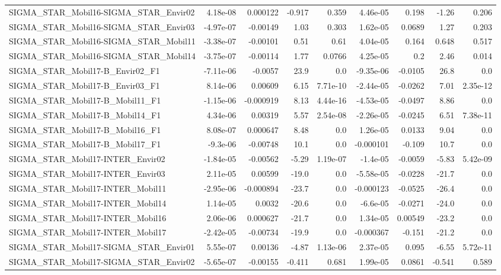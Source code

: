 \begin{tabular}{lrrrrrrrr}
SIGMA_STAR_Mobil16-SIGMA_STAR_Envir02 & 4.18e-08 & 0.000122 & -0.917 & 0.359 & 4.46e-05 & 0.198 & -1.26 & 0.206 \\
SIGMA_STAR_Mobil16-SIGMA_STAR_Envir03 & -4.97e-07 & -0.00149 & 1.03 & 0.303 & 1.62e-05 & 0.0689 & 1.27 & 0.203 \\
SIGMA_STAR_Mobil16-SIGMA_STAR_Mobil11 & -3.38e-07 & -0.00101 & 0.51 & 0.61 & 4.04e-05 & 0.164 & 0.648 & 0.517 \\
SIGMA_STAR_Mobil16-SIGMA_STAR_Mobil14 & -3.75e-07 & -0.00114 & 1.77 & 0.0766 & 4.25e-05 & 0.2 & 2.46 & 0.014 \\
SIGMA_STAR_Mobil17-B_Envir02_F1 & -7.11e-06 & -0.0057 & 23.9 & 0.0 & -9.35e-06 & -0.0105 & 26.8 & 0.0 \\
SIGMA_STAR_Mobil17-B_Envir03_F1 & 8.14e-06 & 0.00609 & 6.15 & 7.71e-10 & -2.44e-05 & -0.0262 & 7.01 & 2.35e-12 \\
SIGMA_STAR_Mobil17-B_Mobil11_F1 & -1.15e-06 & -0.000919 & 8.13 & 4.44e-16 & -4.53e-05 & -0.0497 & 8.86 & 0.0 \\
SIGMA_STAR_Mobil17-B_Mobil14_F1 & 4.34e-06 & 0.00319 & 5.57 & 2.54e-08 & -2.26e-05 & -0.0245 & 6.51 & 7.38e-11 \\
SIGMA_STAR_Mobil17-B_Mobil16_F1 & 8.08e-07 & 0.000647 & 8.48 & 0.0 & 1.26e-05 & 0.0133 & 9.04 & 0.0 \\
SIGMA_STAR_Mobil17-B_Mobil17_F1 & -9.3e-06 & -0.00748 & 10.1 & 0.0 & -0.000101 & -0.109 & 10.7 & 0.0 \\
SIGMA_STAR_Mobil17-INTER_Envir02 & -1.84e-05 & -0.00562 & -5.29 & 1.19e-07 & -1.4e-05 & -0.0059 & -5.83 & 5.42e-09 \\
SIGMA_STAR_Mobil17-INTER_Envir03 & 2.11e-05 & 0.00599 & -19.0 & 0.0 & -5.58e-05 & -0.0228 & -21.7 & 0.0 \\
SIGMA_STAR_Mobil17-INTER_Mobil11 & -2.95e-06 & -0.000894 & -23.7 & 0.0 & -0.000123 & -0.0525 & -26.4 & 0.0 \\
SIGMA_STAR_Mobil17-INTER_Mobil14 & 1.14e-05 & 0.0032 & -20.6 & 0.0 & -6.6e-05 & -0.0271 & -24.0 & 0.0 \\
SIGMA_STAR_Mobil17-INTER_Mobil16 & 2.06e-06 & 0.000627 & -21.7 & 0.0 & 1.34e-05 & 0.00549 & -23.2 & 0.0 \\
SIGMA_STAR_Mobil17-INTER_Mobil17 & -2.42e-05 & -0.00734 & -19.9 & 0.0 & -0.000367 & -0.151 & -21.2 & 0.0 \\
SIGMA_STAR_Mobil17-SIGMA_STAR_Envir01 & 5.55e-07 & 0.00136 & -4.87 & 1.13e-06 & 2.37e-05 & 0.095 & -6.55 & 5.72e-11 \\
SIGMA_STAR_Mobil17-SIGMA_STAR_Envir02 & -5.65e-07 & -0.00155 & -0.411 & 0.681 & 1.99e-05 & 0.0861 & -0.541 & 0.589 \\

\end{tabular}
